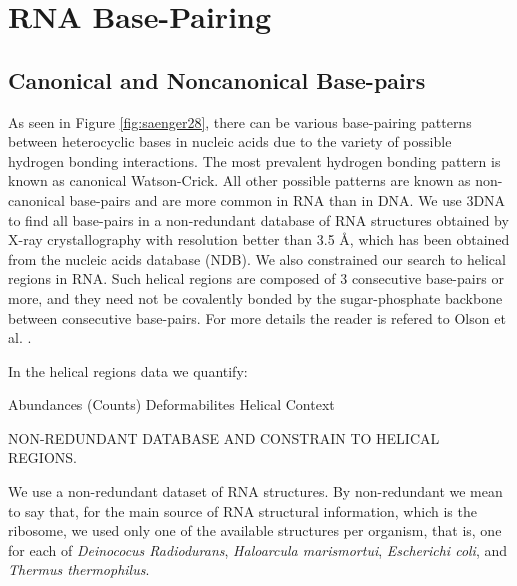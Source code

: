\chapter{RNA Base-Pairing}
\label{basepairs} 

\section{Canonical and Noncanonical Base-pairs} 
As  seen   in  Figure   \ref{fig:saenger28},  there  can   be  various
base-pairing patterns between heterocyclic  bases in nucleic acids due
to the  variety of possible  hydrogen bonding interactions.   The most
prevalent   hydrogen   bonding   pattern   is   known   as   canonical
Watson-Crick. All  other possible patterns are  known as non-canonical
base-pairs and  are more common  in RNA than  in DNA.  We use  3DNA to
find  all base-pairs  in a  non-redundant database  of  RNA structures
obtained by X-ray crystallography with resolution better than 3.5 \AA,
which has  been obtained  from the nucleic  acids database  (NDB).  We
also constrained our  search to helical regions in  RNA.  Such helical
regions are  composed of  3 consecutive base-pairs  or more,  and they
need not be covalently  bonded by the sugar-phosphate backbone between
consecutive  base-pairs.  For more  details the  reader is  refered to
Olson et al. \cite{olson2009}.



In the helical regions data we quantify:

Abundances (Counts)
Deformabilites
Helical Context



NON-REDUNDANT DATABASE AND CONSTRAIN TO HELICAL REGIONS.

We use a non-redundant dataset of RNA structures.  By non-redundant we
mean to say  that, for the main source  of RNA structural information,
which is  the ribosome, we used  only one of  the available structures
per   organism,  that   is,   one  for   each  of   \textit{Deinococus
  Radiodurans},  \textit{Haloarcula  marismortui},  \textit{Escherichi
  coli},  and  \textit{Thermus thermophilus}.

